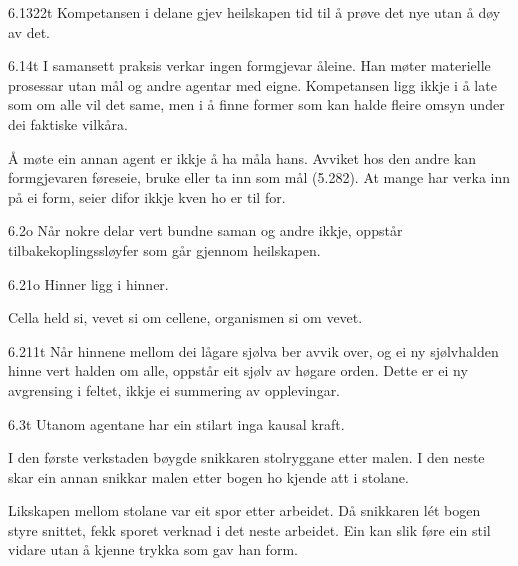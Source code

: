 \begin{formproposition}{6.1322}{t}
Kompetansen i delane gjev heilskapen tid til å prøve det nye utan å døy av det.
\end{formproposition}

\begin{formproposition}{6.14}{t}
I samansett praksis verkar ingen formgjevar åleine. Han møter materielle prosessar utan mål og andre agentar med eigne. Kompetansen ligg ikkje i å late som om alle vil det same, men i å finne former som kan halde fleire omsyn under dei faktiske vilkåra.

Å møte ein annan agent er ikkje å ha måla hans. Avviket hos den andre kan formgjevaren føreseie, bruke eller ta inn som mål (5.282). At mange har verka inn på ei form, seier difor ikkje kven ho er til for.
\end{formproposition}

\begin{formproposition}{6.2}{o}
Når nokre delar vert bundne saman og andre ikkje, oppstår tilbakekoplingssløyfer som går gjennom heilskapen.
\end{formproposition}

\begin{formproposition}{6.21}{o}
Hinner ligg i hinner.

Cella held si, vevet si om cellene, organismen si om vevet.
\end{formproposition}

\begin{formproposition}{6.211}{t}
Når hinnene mellom dei lågare sjølva ber avvik over, og ei ny sjølvhalden hinne vert halden om alle, oppstår eit sjølv av høgare orden. Dette er ei ny avgrensing i feltet, ikkje ei summering av opplevingar.
\end{formproposition}

\begin{formproposition}{6.3}{t}
Utanom agentane har ein stilart inga kausal kraft.

I den første verkstaden bøygde snikkaren stolryggane etter malen. I den neste skar ein annan snikkar malen etter bogen ho kjende att i stolane.

Likskapen mellom stolane var eit spor etter arbeidet. Då snikkaren lét bogen styre snittet, fekk sporet verknad i det neste arbeidet. Ein kan slik føre ein stil vidare utan å kjenne trykka som gav han form.
\end{formproposition}

